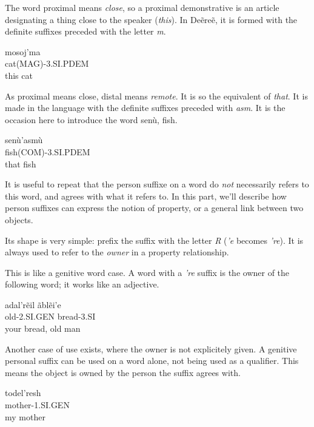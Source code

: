 The word proximal means \emph{close}, so a proximal demonstrative is an article designating a thing
close to the speaker (\emph{this}). In Deẽreẽ, it is formed with the definite suffixes preceded with
the letter \emph{m}.

\begin{exe}
\ex\label{exe:person-prox-dem}
\gll mosoj’ma\\
cat(MAG)-3.SI.PDEM\\
\trans this cat
\end{exe}

As proximal means close, distal means \emph{remote}. It is so the equivalent of \emph{that}. It is
made in the language with the definite suffixes preceded with \emph{asm}. It is the occasion here to
introduce the word \gls{senù}, fish.

\begin{exe}
\ex\label{exe:person-dist-dem}
\gll \gls{senù}’asmù\\
fish(COM)-3.SI.PDEM\\
\trans that fish
\end{exe}

It is useful to repeat that the person suffixe on a word do \emph{not} necessarily refers to this
word, and agrees with what it refers to. In this part, we’ll describe how person suffixes can
express the notion of property, or a general link between two objects.

Its shape is very simple: prefix the suffix with the letter \emph{R} (\emph{’e} becomes \emph{’re}).
It is always used to refer to the \emph{owner} in a property relationship.

This is like a genitive word case. A word with a \emph{’re} suffix is the owner of the following
word; it works like an adjective.

\begin{exe}
\ex\label{exe:person-gen-2obj}
\gll \gls{adal}’rẽil \gls{ãblẽi}’e\\
old-2.SI.GEN bread-3.SI\\
\trans your bread, old man
\end{exe}

Another case of use exists, where the owner is not explicitely given. A genitive personal suffix can
be used on a word alone, not being used as a qualifier. This means the object is owned by the person
the suffix agrees with.

\begin{exe}
\ex\label{exe:person-gen-1obj}
\gll \gls{todel}’resh\\
mother-1.SI.GEN\\
\trans my mother
\end{exe}

